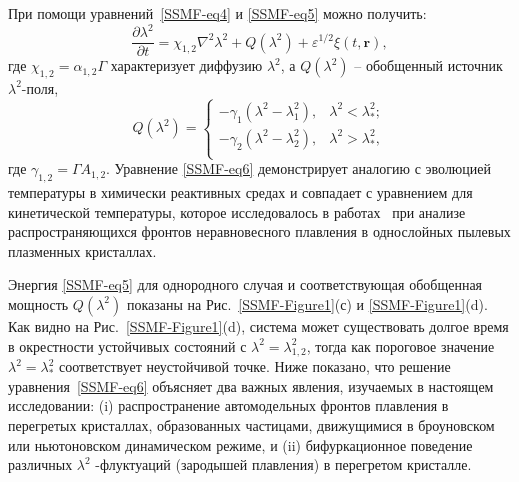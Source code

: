 При помощи уравнений~\eqref{SSMF-eq4} и \eqref{SSMF-eq5} можно получить:
\begin{equation}
  \label{SSMF-eq6}
  \frac{\partial \lambda^2}{\partial t} = \chi_{1,2} \nabla^2\lambda^2 + Q(\lambda^2) +  \varepsilon^{1/2}\xi(t,\mathbf{r}),
\end{equation}
где $ \chi_{1,2} = \alpha_{1,2} \Gamma$ характеризует диффузию $\lambda^2$,
а $ Q (\lambda ^ 2) $ -- обобщенный источник $ \lambda^2$-поля,
\begin{equation}
  \label{SSMF-eq7}
  Q(\lambda^2) =
  \left\{
    \begin{array}{ll}
      -\gamma_{1}\left(\lambda^2-\lambda_{1}^2\right), & \lambda^2  < \lambda_\ast^2;\\
      -\gamma_{2}\left(\lambda^2-\lambda_{2}^2\right), & \lambda^2 > \lambda_\ast^2,\\
    \end{array}
  \right.
\end{equation}
где $\gamma_{1,2} = \Gamma A_{1,2}$.
Уравнение \eqref{SSMF-eq6} демонстрирует аналогию с эволюцией температуры в химически реактивных средах \cite{10.1088/0004-637x/805/1/59} и совпадает с уравнением для кинетической температуры, которое исследовалось в работах~\cite{10.1103/physreve.96.043201, 10.1103/physreve.97.043206, 10.1103/physreve.100.023203} при анализе распространяющихся фронтов неравновесного плавления в однослойных пылевых плазменных кристаллах.

Энергия \eqref{SSMF-eq5} для однородного случая и соответствующая обобщенная мощность $ Q (\lambda ^ 2) $ показаны на Рис.~\ref{SSMF-Figure1}(с) и \ref{SSMF-Figure1}(d).
Как видно на Рис.~\ref{SSMF-Figure1}(d), система может существовать долгое время в окрестности устойчивых состояний с $\lambda^2= \lambda_{1,2} ^ 2 $, тогда как пороговое значение $\lambda^2=\lambda_\ast^2$ соответствует неустойчивой точке.
Ниже показано, что решение уравнения~\eqref{SSMF-eq6} объясняет два важных явления, изучаемых в настоящем исследовании:
(i) распространение автомодельных фронтов плавления в перегретых кристаллах, образованных частицами, движущимися в броуновском или ньютоновском динамическом режиме, и (ii) бифуркационное поведение различных $\lambda^2$ -флуктуаций (зародышей плавления) в перегретом кристалле.

